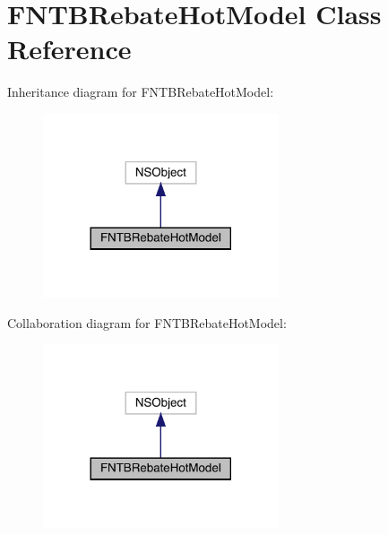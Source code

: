 \hypertarget{interface_f_n_t_b_rebate_hot_model}{}\section{F\+N\+T\+B\+Rebate\+Hot\+Model Class Reference}
\label{interface_f_n_t_b_rebate_hot_model}


Inheritance diagram for F\+N\+T\+B\+Rebate\+Hot\+Model\+:\nopagebreak
\begin{figure}[H]
\begin{center}
\leavevmode
\includegraphics[width=197pt]{interface_f_n_t_b_rebate_hot_model__inherit__graph}
\end{center}
\end{figure}


Collaboration diagram for F\+N\+T\+B\+Rebate\+Hot\+Model\+:\nopagebreak
\begin{figure}[H]
\begin{center}
\leavevmode
\includegraphics[width=197pt]{interface_f_n_t_b_rebate_hot_model__coll__graph}
\end{center}
\end{figure}
